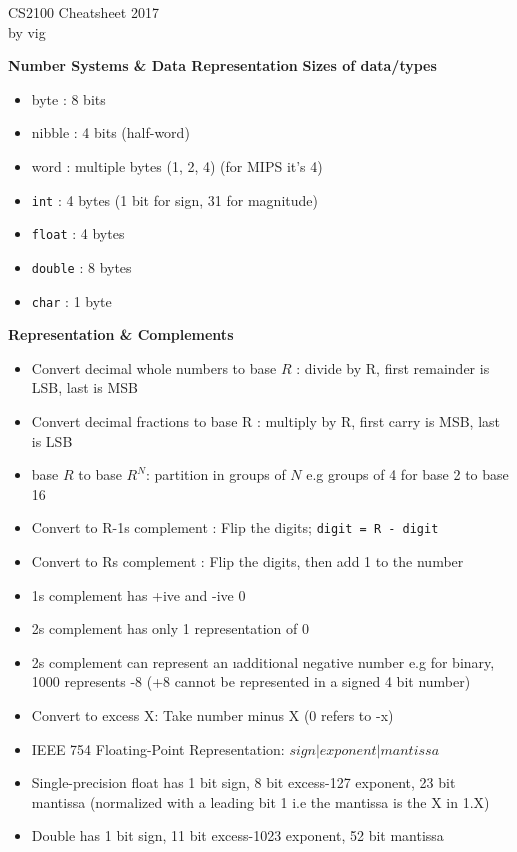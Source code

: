 \documentclass[a4paper]{article} \usepackage[backend=biber, style=numeric, sorting=none]{biblatex}
\begin{document}
\setlength\parindent{0pt} %
\scriptsize
{}

\begin{center}
{\large CS2100 Cheatsheet 2017}\\{by vig}
\end{center}
    \begin{multicols*}{4}

{\small\textbf{Number Systems \& Data Representation }}
\textbf{Sizes of data/types}
\begin{itemize} 
\itemsep -0.5em
\item byte : 8 bits \item nibble : 4 bits (half-word)
\item word : multiple bytes (1, 2, 4) (for MIPS it's 4)
\item \texttt{int} : 4 bytes (1 bit for sign, 31 for magnitude)
\item \texttt{float} : 4 bytes
\item \texttt{double} : 8 bytes
\item \texttt{char} : 1 byte
\end{itemize}

\textbf{Representation \& Complements}
\begin{itemize}
\itemsep -0.5em
\item Convert decimal whole numbers to base $R$ : divide by R, first remainder is LSB, last is MSB
\item Convert decimal fractions to base R : multiply by R, first carry is MSB, last is LSB
\item base ${R}$ to base ${R^N}$: partition in groups of $N$ e.g groups of 4 for base 2 to base 16
\item Convert to R-1s complement : Flip the digits; \texttt{digit = R - digit}
\item Convert to Rs complement : Flip the digits, then add 1 to the number
\item 1s complement has +ive and -ive 0
\item 2s complement has only 1 representation of 0
\item 2s complement can represent an \i{additional} negative number e.g for binary, 1000 represents -8 (+8 cannot be represented in a signed 4 bit number)
\item Convert to excess X: Take number minus X (0 refers to -x)
\item IEEE 754 Floating-Point Representation:  $sign  | exponent  |  mantissa$
\item Single-precision float has 1 bit sign, 8 bit excess-127 exponent, 23 bit mantissa (normalized with a leading bit 1 i.e the mantissa is the X in 1.X)
\item Double has 1 bit sign, 11 bit excess-1023 exponent, 52 bit mantissa 
\end{itemize}


\end{multicols*}
\end{document}
